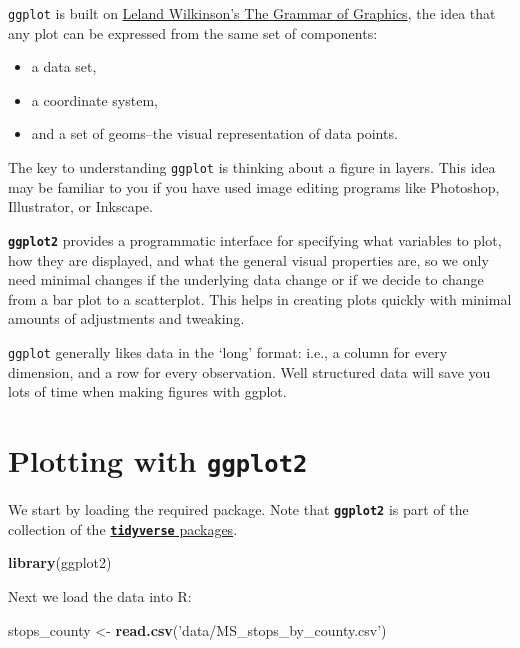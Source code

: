 \documentclass[]{book}
\newenvironment{Shaded}{\begin{snugshade}}{\end{snugshade}}
\newcommand{\KeywordTok}[1]{\textcolor[rgb]{0.13,0.29,0.53}{\textbf{#1}}}
\newcommand{\NormalTok}[1]{#1}
\newcommand{\StringTok}[1]{\textcolor[rgb]{0.31,0.60,0.02}{#1}}
\providecommand{\tightlist}{%
  \setlength{\itemsep}{0pt}\setlength{\parskip}{0pt}}
\begin{document}
\texttt{ggplot} is built on \href{https://stanford.idm.oclc.org/login?url=http://www.myilibrary.com?id=46066}{Leland Wilkinson's The Grammar of Graphics}, the idea that any plot can be expressed from the same set of components:

\begin{itemize}
\tightlist
\item
  a data set,
\item
  a coordinate system,
\item
  and a set of geoms--the visual representation of data points.
\end{itemize}

The key to understanding \texttt{ggplot} is thinking about a figure in layers. This idea may be familiar to you if you have used image editing programs like Photoshop, Illustrator, or Inkscape.

\textbf{\texttt{ggplot2}} provides a programmatic interface for
specifying what variables to plot, how they are displayed, and what the general visual properties are, so we only need minimal changes if the underlying data change or if we decide to change from a bar plot to a scatterplot. This helps in creating plots quickly with minimal amounts of adjustments and tweaking.

\texttt{ggplot} generally likes data in the `long' format: i.e., a column for every dimension, and a row for every observation. Well structured data will save you lots of time when making figures with ggplot.

\hypertarget{plotting-with-ggplot2}{%
\section{\texorpdfstring{Plotting with \textbf{\texttt{ggplot2}}}{Plotting with ggplot2}}\label{plotting-with-ggplot2}}

We start by loading the required package. Note that \textbf{\texttt{ggplot2}} is part of the collection of the \href{https://www.tidyverse.org}{\textbf{\texttt{tidyverse}} packages}.

\begin{Shaded}
\begin{Highlighting}[]
\KeywordTok{library}\NormalTok{(ggplot2)}
\end{Highlighting}
\end{Shaded}

Next we load the data into R:

\begin{Shaded}
\begin{Highlighting}[]
\NormalTok{stops_county <-}\StringTok{ }\KeywordTok{read.csv}\NormalTok{(}\StringTok{'data/MS_stops_by_county.csv'}\NormalTok{)}
\end{Highlighting}
\end{Shaded}
\end{document}

